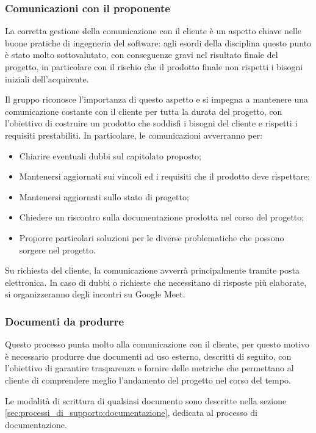 \subsubsection{Comunicazioni con il proponente}
La corretta gestione della comunicazione con il cliente è un aspetto chiave nelle buone pratiche di ingegneria del software: agli esordi della disciplina questo punto è stato molto sottovalutato, con conseguenze gravi nel risultato finale del progetto, in particolare con il rischio che il prodotto finale non rispetti i bisogni iniziali dell'acquirente.
\par Il gruppo riconosce l'importanza di questo aspetto e si impegna a mantenere una comunicazione costante con il cliente per tutta la durata del progetto, con l'obiettivo di costruire un prodotto che soddisfi i bisogni del cliente e rispetti i requisiti prestabiliti. In particolare, le comunicazioni avverranno per:
\begin{itemize}
    \item Chiarire eventuali dubbi sul capitolato proposto;
    \item Mantenersi aggiornati sui vincoli ed i requisiti che il prodotto deve rispettare;
    \item Mantenersi aggiornati sullo stato di progetto;
    \item Chiedere un riscontro sulla documentazione prodotta nel corso del progetto;
    \item Proporre particolari soluzioni per le diverse problematiche che possono sorgere nel progetto.
\end{itemize}
Su richiesta del cliente, la comunicazione avverrà principalmente tramite posta elettronica. In caso di dubbi o richieste che necessitano di risposte più elaborate, si organizzeranno degli incontri su Google Meet.
\subsubsection{Documenti da produrre}
Questo processo punta molto alla comunicazione con il cliente, per questo motivo è necessario produrre due documenti ad uso esterno, descritti di seguito, con l'obiettivo di garantire trasparenza e fornire delle metriche che permettano al cliente di comprendere meglio l'andamento del progetto nel corso del tempo.
\par Le modalità di scrittura di qualsiasi documento sono descritte nella sezione \ref{sec:processi_di_supporto:documentazione}, dedicata al processo di documentazione.
